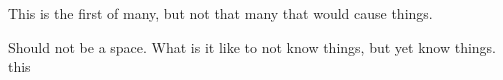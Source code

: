 This is the first of many, but not that many that would cause things. %

Should not be a space.
What is it like to not know things, but yet know things.
this
